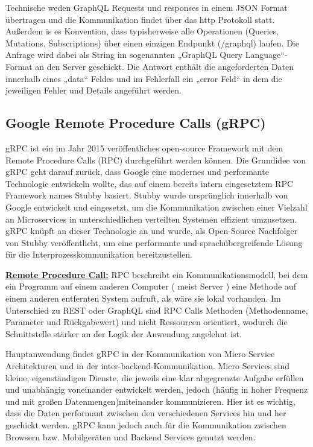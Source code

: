 Technische weden GraphQL Requests und responses in einem JSON Format übertragen und die Kommunikation findet über das http Protokoll statt. Außerdem is es Konvention, dass typisherweise alle Operationen (Queries, Mutations, Subscriptions) über einen einzigen Endpunkt (/graphql) laufen.
Die Anfrage wird dabei als String im sogenannten „GraphQL Query Language“-Format an den Server geschickt. Die Antwort enthält die angeforderten Daten innerhalb eines „data“ Feldes und im Fehlerfall ein „error Feld“ in dem die jeweiligen Fehler und Details angeführt werden.

\clearpage
\subsection{Google Remote Procedure Calls (gRPC)}
gRPC ist ein im Jahr 2015 veröffentliches open-source Framework mit dem Remote Procedure Calls (RPC) durchgeführt werden können. Die Grundidee von gRPC geht darauf zurück, dass Google eine modernes und performante Technologie entwickeln wollte, das auf einem bereits intern eingesetztem RPC Framework names Stubby basiert. 
Stubby wurde ursprünglich innerhalb von Google entwickelt und eingesetzt, um die Kommunikation zwischen einer Vielzahl an Microservices in unterschiedlichen verteilten Systemen effizient umzusetzen. gRPC knüpft an dieser Technologie an und wurde, als Open-Source Nachfolger von Stubby veröffentlicht, um eine performante und sprachübergreifende Lösung für die Interprozesskommunikation bereitzustellen.

\textbf{\underline{Remote Procedure Call:}}
RPC beschreibt ein Kommunikationsmodell, bei dem ein Programm auf einem anderen Computer ( meist Server ) eine Methode auf einem anderen entfernten System aufruft, als wäre sie lokal vorhanden. Im Unterschied zu REST oder GraphQL sind RPC Calls Methoden (Methodenname, Parameter und Rückgabewert) und nicht Ressourcen orientiert, wodurch die Schnittstelle stärker an der Logik der Anwendung angelehnt ist. 

Hauptanwendung findet gRPC in der Kommunikation von Micro Service Architekturen und in der inter-backend-Kommunikation. Micro Services sind kleine, eigenständigen Dienste, die jeweils eine klar abgegrenzte Aufgabe erfüllen und unabhängig voneinander entwickelt werden, jedoch (häufig in hoher Frequenz und mit großen Datenmengen)miteinander kommunizieren. Hier ist es wichtig, dass die Daten performant zwischen den verschiedenen Services hin und her geschickt werden. gRPC kann jedoch auch für die Kommunikation zwischen Browsern bzw. Mobilgeräten und Backend Services genutzt werden.

